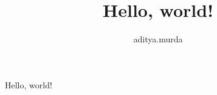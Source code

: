 \documentclass[a4paper, 11pt, final]{article}
\title{Hello, world!}
\author{aditya.murda}
\begin{document}
	Hello, world!
\end{document}
